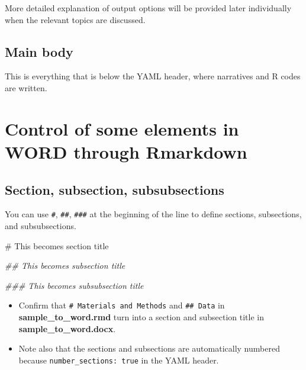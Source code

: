 \documentclass[
  letterpaper,
  DIV=11,
  numbers=noendperiod]{scrreprt}
\newenvironment{Shaded}{\begin{snugshade}}{\end{snugshade}}
\newcommand{\CommentTok}[1]{\textcolor[rgb]{0.37,0.37,0.37}{#1}}
\newcommand{\DocumentationTok}[1]{\textcolor[rgb]{0.37,0.37,0.37}{\textit{#1}}}
\providecommand{\tightlist}{%
  \setlength{\itemsep}{0pt}\setlength{\parskip}{0pt}}\usepackage{longtable,booktabs,array}
\begin{document}
More detailed explanation of output options will be provided later
individually when the relevant topics are discussed.

\hypertarget{main-body}{%
\subsection{Main body}\label{main-body}}

This is everything that is below the YAML header, where narratives and R
codes are written.

\hypertarget{control-of-some-elements-in-word-through-rmarkdown}{%
\section{Control of some elements in WORD through
Rmarkdown}\label{control-of-some-elements-in-word-through-rmarkdown}}

\hypertarget{section-subsection-subsubsections}{%
\subsection{Section, subsection,
subsubsections}\label{section-subsection-subsubsections}}

You can use \texttt{\#}, \texttt{\#\#}, \texttt{\#\#\#} at the beginning
of the line to define sections, subsections, and subsubsections.

\begin{Shaded}
\begin{Highlighting}[]
\CommentTok{\# This becomes section title}

\DocumentationTok{\#\# This becomes subsection title}

\DocumentationTok{\#\#\# This becomes subsubsection title}
\end{Highlighting}
\end{Shaded}

\begin{tcolorbox}[enhanced jigsaw, colframe=quarto-callout-note-color-frame, toptitle=1mm, colbacktitle=quarto-callout-note-color!10!white, toprule=.15mm, colback=white, arc=.35mm, bottomtitle=1mm, opacitybacktitle=0.6, breakable, left=2mm, coltitle=black, leftrule=.75mm, title=\textcolor{quarto-callout-note-color}{\faInfo}\hspace{0.5em}{Note}, rightrule=.15mm, titlerule=0mm, opacityback=0, bottomrule=.15mm]

\begin{itemize}
\tightlist
\item
  Confirm that \texttt{\#\ Materials\ and\ Methods} and
  \texttt{\#\#\ Data} in \textbf{sample\_to\_word.rmd} turn into a
  section and subsection title in \textbf{sample\_to\_word.docx}.
\item
  Note also that the sections and subsections are automatically numbered
  because \texttt{number\_sections:\ true} in the YAML header.
\end{itemize}

\end{tcolorbox}
\end{document}
